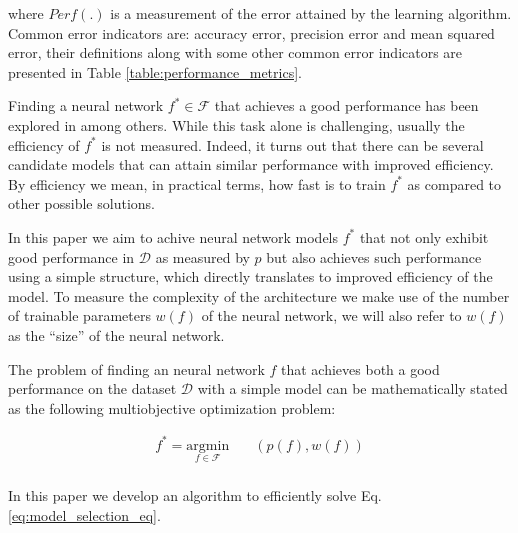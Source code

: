 \documentclass[journal]{IEEEtran}
\begin{document}
where $Perf(.)$ is a measurement of the error attained by the learning algorithm. Common error indicators are: accuracy error, precision error and mean squared error, their definitions along with some other common error indicators are presented in Table \ref{table:performance_metrics}. 

Finding a neural network $f^* \in \mathcal{F}$ that achieves a good performance has been explored in \cite{Jin2018, Real2018} among others. While this task alone is challenging, usually the efficiency of $f^*$ is not measured. Indeed, it turns out that there can be several candidate models that can attain similar performance with improved efficiency. By efficiency we mean, in practical terms, how fast is to train $f^*$ as compared to other possible solutions. 

In this paper we aim to achive neural network models $f^*$ that not only exhibit good performance in $\mathcal{D}$ as measured by $p$ but also achieves such performance using a simple structure, which directly translates to improved efficiency of the model. To measure the complexity of the architecture we make use of the number of trainable parameters $w(f)$ of the neural network, we will also refer to $w(f)$ as the ``size'' of the neural network.

The problem of finding an neural network $f$ that achieves both a good performance on the dataset $\mathcal{D}$ with a simple model can be mathematically stated as the following multiobjective optimization problem:

\begin{equation}
	\begin{aligned}
	f^* = \underset{f \in \mathcal{F}}{\text{argmin}}
	& \quad (p(f), w(f))\\
	\end{aligned}
	\label{eq:model_selection_eq}
\end{equation}

In this paper we develop an algorithm to efficiently solve Eq. \ref{eq:model_selection_eq}.
\end{document}
